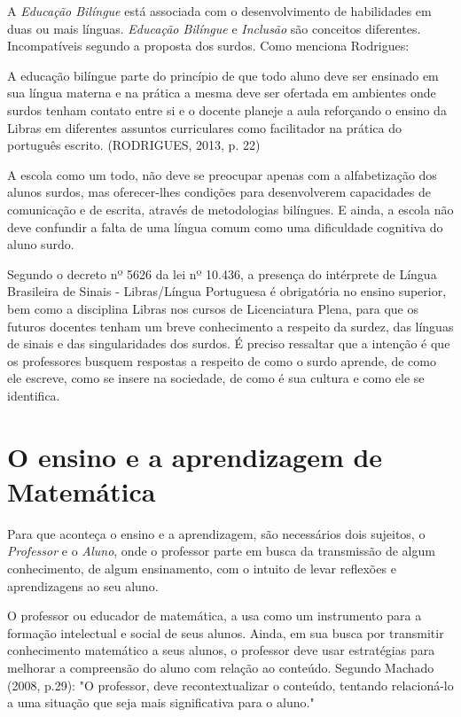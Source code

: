 \documentclass[brasil]{abnt}
\begin{document}
	A \textit{Educação Bilíngue} está associada com o desenvolvimento de habilidades em duas ou mais línguas. \textit{Educação Bilíngue} e \textit{Inclusão} são conceitos diferentes. Incompatíveis segundo a proposta dos surdos.
	Como menciona Rodrigues:
	
		\begin{citacao} A educação bilíngue parte do princípio de que todo aluno deve ser ensinado em sua língua materna e na prática a mesma deve ser ofertada em ambientes onde surdos tenham contato entre si e o 
						docente planeje a aula reforçando o ensino da Libras em diferentes assuntos curriculares como facilitador na prática do português escrito. (RODRIGUES, 2013, p. 22) 
		\end{citacao}

	A escola como um todo, não deve se preocupar apenas com a alfabetização dos alunos surdos, mas oferecer-lhes condições para desenvolverem capacidades de comunicação e de escrita, através de 
	metodologias bilíngues.	E ainda, a escola não deve confundir a falta de uma língua comum como uma dificuldade cognitiva do aluno surdo. 
	
	Segundo o decreto nº 5626 da lei nº 10.436, a presença do 
	intérprete de Língua Brasileira de Sinais - Libras/Língua 
	Portuguesa é obrigatória no ensino superior, bem como a disciplina 
	Libras nos cursos de Licenciatura Plena,
	para que os futuros docentes tenham um breve conhecimento a respeito da surdez, das línguas de sinais e das singularidades dos surdos. É preciso ressaltar que a intenção é que os professores busquem
	respostas a respeito de como o surdo aprende, de como ele escreve, como se insere na sociedade, de como é sua cultura e como ele se identifica.
	 
											
\chapter{O ensino e a aprendizagem de Matemática}
    Para que aconteça o ensino e a aprendizagem, são necessários dois sujeitos, o \textit{Professor} e o \textit{Aluno}, onde o professor parte em busca da transmissão de algum conhecimento, 
    de algum ensinamento, com o intuito de levar reflexões e aprendizagens ao seu aluno.
    
    O professor ou educador de matemática, a usa como um instrumento para a formação intelectual e social de seus alunos. Ainda, em sua busca por transmitir conhecimento matemático a seus alunos, o 
    professor deve usar estratégias para melhorar a compreensão do 
    aluno com relação ao conteúdo. 
    Segundo Machado (2008, p.29): "O professor, deve 
    recontextualizar o conteúdo, tentando relacioná-lo a uma situação que seja mais significativa para o aluno."
    
\end{document}
